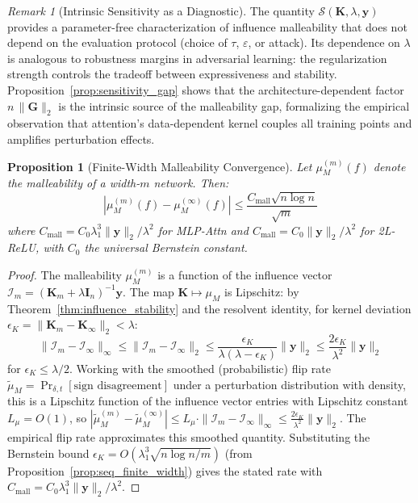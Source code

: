 \documentclass{article}
\theoremstyle{plain}
\newtheorem{proposition}[theorem]{Proposition}
\theoremstyle{definition}
\theoremstyle{remark}
\newtheorem{remark}[theorem]{Remark}
\begin{document}
\begin{remark}[Intrinsic Sensitivity as a Diagnostic]
\label{rmk:intrinsic_diagnostic}
The quantity $\mathcal{S}(\mathbf{K}, \lambda, \mathbf{y})$ provides a parameter-free characterization of influence malleability that does not depend on the evaluation protocol (choice of $\tau$, $\varepsilon$, or attack). Its dependence on $\lambda$ is analogous to robustness margins in adversarial learning: the regularization strength controls the tradeoff between expressiveness and stability. Proposition~\ref{prop:sensitivity_gap} shows that the architecture-dependent factor $n\,\|\mathbf{G}\|_2$ is the intrinsic source of the malleability gap, formalizing the empirical observation that attention's data-dependent kernel couples all training points and amplifies perturbation effects.
\end{remark}

\begin{proposition}[Finite-Width Malleability Convergence]
\label{prop:mall_convergence}
Let $\mu_M^{(m)}(f)$ denote the malleability of a width-$m$ network. Then:
$$\left|\mu_M^{(m)}(f) - \mu_M^{(\infty)}(f)\right| \leq \frac{C_{\text{mall}}\sqrt{n \log n}}{\sqrt{m}}$$
where $C_{\text{mall}} = C_0 \lambda_1^3 \|\mathbf{y}\|_2 / \lambda^2$ for MLP-Attn and $C_{\text{mall}} = C_0 \|\mathbf{y}\|_2 / \lambda^2$ for 2L-ReLU, with $C_0$ the universal Bernstein constant.
\end{proposition}

\begin{proof}
The malleability $\mu_M^{(m)}$ is a function of the influence vector $\boldsymbol{\mathcal{I}}_m = (\mathbf{K}_m + \lambda\mathbf{I}_n)^{-1}\mathbf{y}$. The map $\mathbf{K} \mapsto \mu_M$ is Lipschitz: by Theorem~\ref{thm:influence_stability} and the resolvent identity, for kernel deviation $\epsilon_K = \|\mathbf{K}_m - \mathbf{K}_\infty\|_2 < \lambda$:
$$\|\boldsymbol{\mathcal{I}}_m - \boldsymbol{\mathcal{I}}_\infty\|_\infty \leq \|\boldsymbol{\mathcal{I}}_m - \boldsymbol{\mathcal{I}}_\infty\|_2 \leq \frac{\epsilon_K}{\lambda(\lambda - \epsilon_K)} \|\mathbf{y}\|_2 \leq \frac{2\epsilon_K}{\lambda^2} \|\mathbf{y}\|_2$$
for $\epsilon_K \leq \lambda/2$. Working with the smoothed (probabilistic) flip rate $\tilde{\mu}_M = \Pr_{\delta,t}[\text{sign disagreement}]$ under a perturbation distribution with density, this is a Lipschitz function of the influence vector entries with Lipschitz constant $L_\mu = O(1)$, so $|\tilde{\mu}_M^{(m)} - \tilde{\mu}_M^{(\infty)}| \leq L_\mu \cdot \|\boldsymbol{\mathcal{I}}_m - \boldsymbol{\mathcal{I}}_\infty\|_\infty \leq \frac{2\epsilon_K}{\lambda^2}\|\mathbf{y}\|_2$. The empirical flip rate approximates this smoothed quantity. Substituting the Bernstein bound $\epsilon_K = O(\lambda_1^3 \sqrt{n\log n/m})$ (from Proposition~\ref{prop:seq_finite_width}) gives the stated rate with $C_{\text{mall}} = C_0 \lambda_1^3 \|\mathbf{y}\|_2 / \lambda^2$.
\end{proof}
\end{document}
